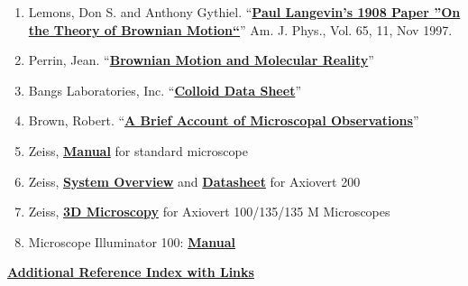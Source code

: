 \documentclass{../lab}
\begin{document}
\begin{enumerate}
    \item Lemons, Don S. and Anthony Gythiel. ``\href{https://drive.google.com/file/d/1ZJe-OLX4lbhrBVt-R1KNOOmmtkhKQPdN/view?usp=drive_link}{\textbf{Paul Langevin's 1908 Paper ''On the Theory of Brownian Motion``}}'' Am. J. Phys., Vol. 65, 11, Nov 1997.

    \item Perrin, Jean. ``\href{https://drive.google.com/file/d/19wnHnKRy5C1jfLdKe5QkmEIGCS8VA1x0/view?usp=drive_link}{\textbf{Brownian Motion and Molecular Reality}}''

    \item Bangs Laboratories, Inc. ``\href{https://drive.google.com/file/d/14BP0-c-ARC6TFctkikj5hvQLsU9uiVBw/view?usp=drive_link}{\textbf{Colloid Data Sheet}}''

    \item Brown, Robert. ``\href{https://drive.google.com/file/d/1nlXiNMmYfoHs95H8YU4xyzsR7xYT0Sag/view?usp=drive_link}{\textbf{A Brief Account of Microscopal Observations}}''

    \item Zeiss, \href{https://drive.google.com/file/d/12iMyoPA33KQKnPiAQGmiizaJaLxrysga/view?usp=drive_link}{\textbf{Manual}} for standard microscope

    \item Zeiss, \href{https://drive.google.com/file/d/1MUnVkC9VQRwUmetuSRfs2ny0iCZ8hUsg/view?usp=drive_link}{\textbf{System Overview}} and \href{https://drive.google.com/file/d/1zPWim9E9D3nSICiSn6lLNHYxjs3tGS6L/view?usp=drive_link}{\textbf{Datasheet}} for Axiovert 200

    \item Zeiss, \href{https://drive.google.com/file/d/12p8vXnbknUH1Mmeu0Zm90iraXQEEikBh/view?usp=drive_link}{\textbf{3D Microscopy}} for Axiovert 100/135/135 M Microscopes


    \item Microscope Illuminator 100: \href{https://drive.google.com/file/d/1cIUkvFUFBjR_ePL1uFoYVeQNXk9aXNMf/view?usp=drive_link}{\textbf{Manual}}
\end{enumerate}

\href{https://drive.google.com/file/d/1sRoag3xtYnx2mrpEpQcGUzS4v6m8vQHM/view?usp=drive_link}{\textbf{Additional Reference Index with Links}}
\end{document}
